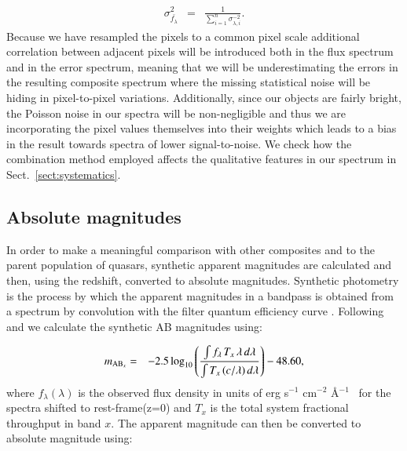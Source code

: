\documentclass{aa}    %
\newcommand{\eqlabel}[1]{\label{eq:#1}}
\newcommand{\sectionname}{Sect.}
\newcommand{\Sect}[1]{\sectionname~\ref{sect:#1}}
\newcommand{\sect}[1]{\Sect{#1}}
\newcommand{\sectlabel}[1]{\label{sect:#1}}
\newcommand{\fluxunit}{erg s$^{-1}$ cm$^{-2}$ \AA$^{-1}$}
\begin{document}
\begin{eqnarray} \eqlabel{sigma-wmean}
\sigma_{\bar{f_{\lambda}}}^2 &=& \frac{ 1 }{\sum_{i=1}^n \sigma_{\lambda, i}^{-2}}.
\end{eqnarray}
Because we have resampled the pixels to a common pixel scale additional correlation between adjacent pixels will be introduced both in the flux spectrum and in the error spectrum, meaning that we will be underestimating the errors in the resulting composite spectrum where the missing statistical noise will be hiding in pixel-to-pixel variations. Additionally, since our objects are fairly bright, the Poisson noise in our spectra will be non-negligible and thus we are incorporating the pixel values themselves into their weights which leads to a bias in the result towards spectra of lower signal-to-noise. We check how the combination method employed affects the qualitative features in our spectrum in \sect{systematics}.

\subsection{Absolute magnitudes} \sectlabel{absmag}

In order to make a meaningful comparison with other composites and to the parent population of quasars, synthetic apparent magnitudes are calculated and then, using the redshift, converted to absolute magnitudes. Synthetic photometry is the process by which the apparent magnitudes in a bandpass is obtained from a spectrum by convolution with the filter quantum efficiency curve \citep{Bessell2005}. Following \citet{Bessell2012} and \citet{Casagrande2014} we calculate the synthetic AB magnitudes using:

\begin{eqnarray}\eqlabel{abmag}
m_{\textmd{AB}_x} &=& -2.5 \log_{10} \left(  \frac{\int f_\lambda \,  T_{x}  \, \lambda \,  d\lambda} 
{\int  T_{x} \,  (c / \lambda) \,  d\lambda} \right) - 48.60,
\end{eqnarray}
where $f_\lambda (\lambda)$ is the observed flux density in units of \fluxunit~ for the spectra shifted to rest-frame(z=0) and $T_{x} $ is the total system fractional throughput in band $x$. The apparent magnitude can then be converted to absolute magnitude using:
\end{document}
